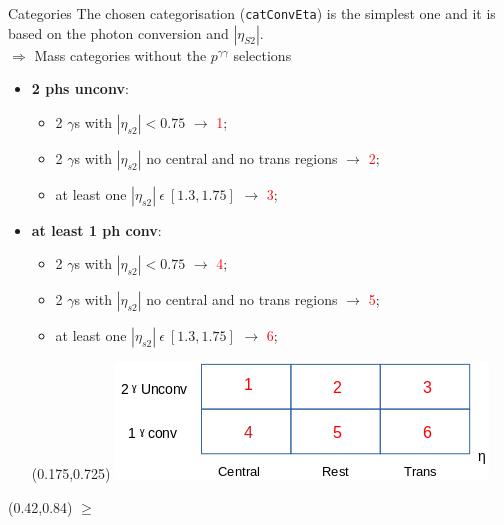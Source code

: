 \documentclass[10pt,UKenglish, leqno, xcolor = dvipsnames]{beamer}
\begin{document}
	\begin{frame}{Categories}
		\vfill
		The chosen categorisation (\texttt{catConvEta}) is the simplest one and it is based on the photon conversion and $|\eta_{S2}|$.\\
		$\Rightarrow$ Mass categories without the $p^{\gamma\gamma}$ selections
		
		\begin{itemize}
			\item \textbf{2 phs unconv}:
			\begin{itemize}
				\item 2 $\gamma$s with $|\eta_{s2}| < 0.75$ $\rightarrow$ \textcolor{red}{1};
				\item 2 $\gamma$s with $|\eta_{s2}|$ no central and no trans regions $\rightarrow$ \textcolor{red}{2};
				\item at least one $|\eta_{s2}|\ \epsilon\ [1.3,1.75]$ $\rightarrow$ \textcolor{red}{3};
			\end{itemize}
			\item \textbf{at least 1 ph conv}:
			\begin{itemize}
				\item 2 $\gamma$s with $|\eta_{s2}| < 0.75$ $\rightarrow$ \textcolor{red}{4};
				\item 2 $\gamma$s with $|\eta_{s2}|$ no central and no trans regions $\rightarrow$ \textcolor{red}{5};
				\item at least one $|\eta_{s2}|\ \epsilon\ [1.3,1.75]$ $\rightarrow$ \textcolor{red}{6};
			\end{itemize}
			
			\begin{textblock}{1}(0.175,0.725)
				\centering
				\includegraphics[width=.5\textwidth]{Pres_Images/HGam/cat_tab.png}
			\end{textblock}
		\end{itemize}
		\begin{textblock}{1}(0.42,0.84)
			\small
			$\geq$
		\end{textblock}
		\vfill
		
	\end{frame}
	
	
	
\end{document}
